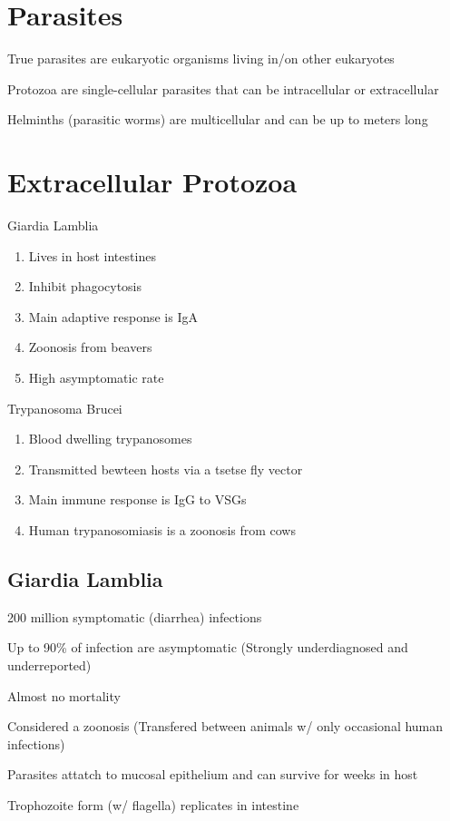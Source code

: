 \documentclass{notes}
\begin{document}
\section*{Parasites}
True parasites are eukaryotic organisms living in/on other eukaryotes

Protozoa are single-cellular parasites that can be intracellular or extracellular

Helminths (parasitic worms) are multicellular and can be up to meters long

\section*{Extracellular Protozoa}
Giardia Lamblia
\begin{enumerate}
    \item Lives in host intestines
    \item Inhibit phagocytosis
    \item Main adaptive response is IgA
    \item Zoonosis from beavers
    \item High asymptomatic rate
\end{enumerate}

Trypanosoma Brucei
\begin{enumerate}
    \item Blood dwelling trypanosomes
    \item Transmitted bewteen hosts via a tsetse fly vector
    \item Main immune response is IgG to VSGs
    \item Human trypanosomiasis is a zoonosis from cows
\end{enumerate}

\subsection*{Giardia Lamblia}
200 million symptomatic (diarrhea) infections

Up to 90\% of infection are asymptomatic (Strongly underdiagnosed and underreported)

Almost no mortality

Considered a zoonosis (Transfered between animals w/ only occasional human infections)

Parasites attatch to mucosal epithelium and can survive for weeks in host

Trophozoite form (w/ flagella) replicates in intestine
\end{document}
